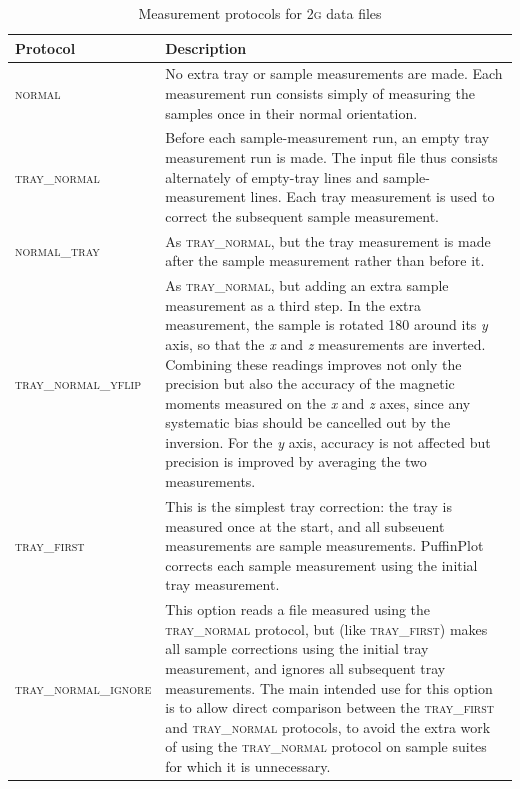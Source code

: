 \documentclass[a4paper]{article}
\newcommand{\caps}[1]{\textsc{#1}} %
\begin{document}
\begin{table}
  \caption{\label{tbl:manual-import-protocols}Measurement protocols for 2\caps{g} data files}

\begin{tabular}{lp{90mm}} \toprule
Protocol & Description \\ \midrule
\caps{normal} &
 No extra tray or sample measurements are made. Each measurement run
 consists simply of measuring the samples once in their normal
 orientation. \\
\caps{tray\_normal} &
 Before each sample-measurement run, an empty tray measurement run
 is made. The input file thus consists alternately of empty-tray
 lines and sample-measurement lines. Each tray measurement is used
 to correct the subsequent sample measurement.
 \\
\caps{normal\_tray} &
 As \caps{tray\_normal}, but the tray measurement is made after
 the sample measurement rather than before it.\\
\caps{tray\_normal\_yflip} &
 As \caps{tray\_normal}, but adding an extra sample measurement as
 a third step. In the extra measurement, the sample is rotated
180\textdegree{} around its {\em y} axis, so that the {\em x} and {\em z}
measurements are inverted. Combining these readings improves not only the
precision but also the accuracy of the magnetic moments measured on the {\em
  x} and {\em z} axes, since any systematic bias should be cancelled out by
the inversion. For the {\em y} axis, accuracy is not affected but
precision is improved by averaging the two measurements. \\
\caps{tray\_first} &
 This is the simplest tray correction: the tray is measured once at the
start, and all subseuent measurements are sample measurements. PuffinPlot
corrects each sample measurement using the initial tray measurement.
\\
\caps{tray\_normal\_ignore} &
This option reads a file measured using the \caps{tray\_normal} protocol, but
(like \caps{tray\_first}) makes all sample corrections using the initial tray
measurement, and ignores all subsequent tray measurements. The main intended
use for this option is to allow direct comparison between the
\caps{tray\_first} and \caps{tray\_normal} protocols, to avoid the extra
work of using the \caps{tray\_normal} protocol on sample suites for which it
is unnecessary. \\ \bottomrule
\end{tabular}
\end{table}
\end{document}
